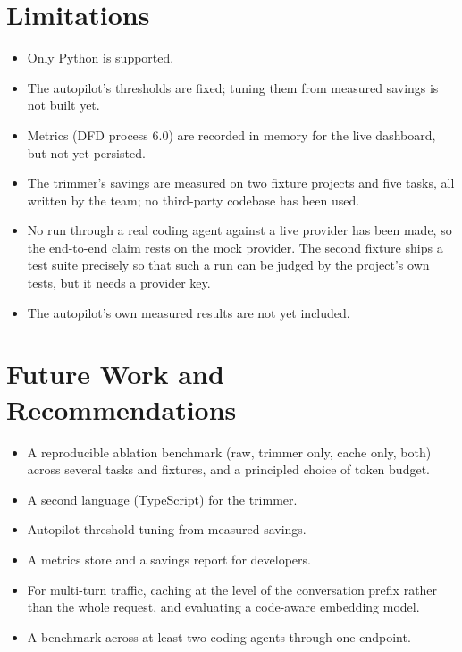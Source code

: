 \documentclass[12pt, a4paper, oneside]{report}
\begin{document}
\section{Limitations}

\begin{itemize}
    \item Only Python is supported.
    \item The autopilot's thresholds are fixed; tuning them from measured
          savings is not built yet.
    \item Metrics (DFD process 6.0) are recorded in memory for the live dashboard, but not yet persisted.
    \item The trimmer's savings are measured on two fixture projects and five
          tasks, all written by the team; no third-party codebase has been used.
    \item No run through a real coding agent against a live provider has been
          made, so the end-to-end claim rests on the mock provider. The second
          fixture ships a test suite precisely so that such a run can be judged
          by the project's own tests, but it needs a provider key.
    \item The autopilot's own measured results are not yet included.
\end{itemize}

\section{Future Work and Recommendations}

\begin{itemize}
    \item A reproducible ablation benchmark (raw, trimmer only, cache only, both)
          across several tasks and fixtures, and a principled choice of token
          budget.
    \item A second language (TypeScript) for the trimmer.
    \item Autopilot threshold tuning from measured savings.
    \item A metrics store and a savings report for developers.
    \item For multi-turn traffic, caching at the level of the conversation prefix
          rather than the whole request, and evaluating a code-aware embedding model.
    \item A benchmark across at least two coding agents through one endpoint.
\end{itemize}
\end{document}
